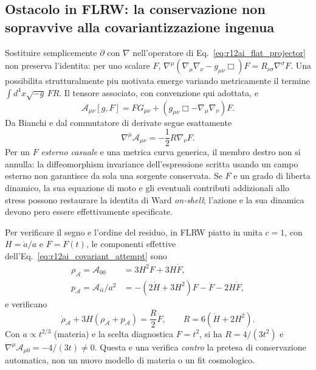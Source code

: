 \documentclass[11pt,a4paper]{article}
\begin{document}
\subsection{Ostacolo in FLRW: la conservazione non sopravvive alla covariantizzazione ingenua}

Sostituire semplicemente $\partial$ con $\nabla$ nell'operatore di Eq.~\eqref{eq:r12ai_flat_projector} non preserva l'identita: per uno scalare $F$, $\nabla^\mu(\nabla_\mu\nabla_\nu-g_{\mu\nu}\Box)F=R_{\nu\sigma}\nabla^\sigma F$. Una possibilita strutturalmente piu motivata emerge variando metricamente il termine $\int\!d^4x\sqrt{-g}\,F R$. Il tensore associato, con convenzione qui adottata, e
\begin{equation}
 \mathcal A_{\mu\nu}[g,F]=F G_{\mu\nu}+
 (g_{\mu\nu}\Box-\nabla_\mu\nabla_\nu)F.
 \label{eq:r12ai_covariant_attempt}
\end{equation}
Da Bianchi e dal commutatore di derivate segue esattamente
\begin{equation}
 \boxed{\nabla^\mu\mathcal A_{\mu\nu}=-\frac12 R\nabla_\nu F.}
 \label{eq:r12ai_noether_obstruction}
\end{equation}
Per un $F$ \emph{esterno casuale} e una metrica curva generica, il membro destro non si annulla: la diffeomorphism invariance dell'espressione scritta usando un campo esterno non garantisce da sola una sorgente conservata. Se $F$ e un grado di liberta dinamico, la sua equazione di moto e gli eventuali contributi addizionali allo stress possono restaurare la identita di Ward \emph{on-shell}; l'azione e la sua dinamica devono pero essere effettivamente specificate.

Per verificare il segno e l'ordine del residuo, in FLRW piatto in unita $c=1$, con $H=\dot a/a$ e $F=F(t)$, le componenti effettive dell'Eq.~\eqref{eq:r12ai_covariant_attempt} sono
\begin{align}
 \rho_{\mathcal A}=\mathcal A_{00}&=3H^2F+3H\dot F,\\
 p_{\mathcal A}=\mathcal A_{ii}/a^2&=-(2\dot H+3H^2)F-\ddot F-2H\dot F,
\end{align}
e verificano
\begin{equation}
 \dot\rho_{\mathcal A}+3H(\rho_{\mathcal A}+p_{\mathcal A})
 =\frac{R}{2}\dot F,\qquad R=6(\dot H+2H^2).
 \label{eq:r12ai_flrw_balance}
\end{equation}
Con $a\propto t^{2/3}$ (materia) e la scelta diagnostica $F=t^2$, si ha $R=4/(3t^2)$ e $\nabla^\mu\mathcal A_{\mu0}=-4/(3t)\ne0$. Questa e una verifica \emph{contro} la pretesa di conservazione automatica, non un nuovo modello di materia o un fit cosmologico.
\end{document}
